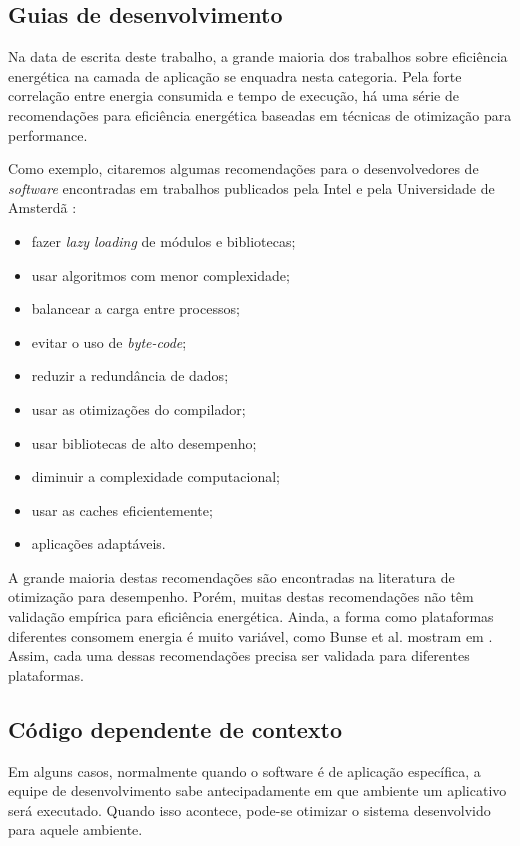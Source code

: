 \subsection{Guias de desenvolvimento}

Na data de escrita deste trabalho, a grande maioria dos trabalhos sobre eficiência energética na camada de aplicação se enquadra nesta categoria. Pela forte correlação entre energia consumida e tempo de execução, há uma série de recomendações para eficiência energética baseadas em técnicas de otimização para performance.

Como exemplo, citaremos algumas recomendações para o desenvolvedores de \emph{software} encontradas em trabalhos publicados pela Intel \cite{VUBestPractices:Online} e pela Universidade de Amsterdã \cite{steigerwald2011developing} :

\begin{itemize}
    \item fazer \emph{lazy loading} de módulos e bibliotecas;
    \item usar algoritmos com menor complexidade;
    \item balancear a carga entre processos;
    \item evitar o uso de \emph{byte-code};
    \item reduzir a redundância de dados;
    \item usar as otimizações do compilador;
    \item usar bibliotecas de alto desempenho;
    \item diminuir a complexidade computacional;
    \item usar as caches eficientemente;
    \item aplicações adaptáveis.
\end{itemize}

A grande maioria destas recomendações são encontradas na literatura de otimização para desempenho. Porém, muitas destas recomendações não têm validação empírica para eficiência energética. Ainda, a forma como plataformas diferentes consomem energia é muito variável, como Bunse et al. mostram em \cite{bunse2009exploring}. Assim, cada uma dessas recomendações precisa ser validada para diferentes plataformas.

\subsection{Código dependente de contexto}

Em alguns casos, normalmente quando o software é de aplicação específica, a equipe de desenvolvimento sabe antecipadamente em que ambiente um aplicativo será executado. Quando isso acontece, pode-se otimizar o sistema desenvolvido para aquele ambiente.

